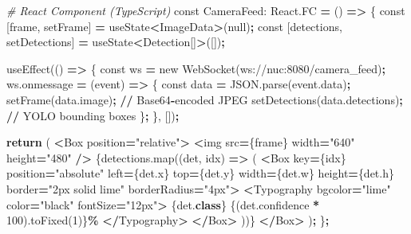 \documentclass[
]{article}
\newenvironment{Shaded}{\begin{snugshade}}{\end{snugshade}}
\newcommand{\BuiltInTok}[1]{#1}
\newcommand{\CommentTok}[1]{\textcolor[rgb]{0.56,0.35,0.01}{\textit{#1}}}
\newcommand{\ControlFlowTok}[1]{\textcolor[rgb]{0.13,0.29,0.53}{\textbf{#1}}}
\newcommand{\DecValTok}[1]{\textcolor[rgb]{0.00,0.00,0.81}{#1}}
\newcommand{\KeywordTok}[1]{\textcolor[rgb]{0.13,0.29,0.53}{\textbf{#1}}}
\newcommand{\NormalTok}[1]{#1}
\newcommand{\OperatorTok}[1]{\textcolor[rgb]{0.81,0.36,0.00}{\textbf{#1}}}
\newcommand{\StringTok}[1]{\textcolor[rgb]{0.31,0.60,0.02}{#1}}
\begin{document}
\begin{Shaded}
\begin{Highlighting}[]
\CommentTok{\# React Component (TypeScript)}
\NormalTok{const CameraFeed: React.FC }\OperatorTok{=}\NormalTok{ () }\OperatorTok{=\textgreater{}}\NormalTok{ \{}
\NormalTok{  const [frame, setFrame] }\OperatorTok{=}\NormalTok{ useState}\OperatorTok{\textless{}}\NormalTok{ImageData}\OperatorTok{\textgreater{}}\NormalTok{(null)}\OperatorTok{;}
\NormalTok{  const [detections, setDetections] }\OperatorTok{=}\NormalTok{ useState}\OperatorTok{\textless{}}\NormalTok{Detection[]}\OperatorTok{\textgreater{}}\NormalTok{([])}\OperatorTok{;}

\NormalTok{  useEffect(() }\OperatorTok{=\textgreater{}}\NormalTok{ \{}
\NormalTok{    const ws }\OperatorTok{=}\NormalTok{ new WebSocket(}\StringTok{\textquotesingle{}ws://nuc:8080/camera\_feed\textquotesingle{}}\NormalTok{)}\OperatorTok{;}
\NormalTok{    ws.onmessage }\OperatorTok{=}\NormalTok{ (event) }\OperatorTok{=\textgreater{}}\NormalTok{ \{}
\NormalTok{      const data }\OperatorTok{=}\NormalTok{ JSON.parse(event.data)}\OperatorTok{;}
\NormalTok{      setFrame(data.image)}\OperatorTok{;}  \OperatorTok{//}\NormalTok{ Base64}\OperatorTok{{-}}\NormalTok{encoded JPEG}
\NormalTok{      setDetections(data.detections)}\OperatorTok{;}  \OperatorTok{//}\NormalTok{ YOLO bounding boxes}
\NormalTok{    \}}\OperatorTok{;}
\NormalTok{  \}, [])}\OperatorTok{;}

  \ControlFlowTok{return}\NormalTok{ (}
    \OperatorTok{\textless{}}\NormalTok{Box position}\OperatorTok{=}\StringTok{"relative"}\OperatorTok{\textgreater{}}
      \OperatorTok{\textless{}}\NormalTok{img src}\OperatorTok{=}\NormalTok{\{frame\} width}\OperatorTok{=}\StringTok{"640"}\NormalTok{ height}\OperatorTok{=}\StringTok{"480"} \OperatorTok{/\textgreater{}}
\NormalTok{      \{detections.}\BuiltInTok{map}\NormalTok{((det, idx) }\OperatorTok{=\textgreater{}}\NormalTok{ (}
        \OperatorTok{\textless{}}\NormalTok{Box key}\OperatorTok{=}\NormalTok{\{idx\} position}\OperatorTok{=}\StringTok{"absolute"}
\NormalTok{             left}\OperatorTok{=}\NormalTok{\{det.x\} top}\OperatorTok{=}\NormalTok{\{det.y\} width}\OperatorTok{=}\NormalTok{\{det.w\} height}\OperatorTok{=}\NormalTok{\{det.h\}}
\NormalTok{             border}\OperatorTok{=}\StringTok{"2px solid lime"}\NormalTok{ borderRadius}\OperatorTok{=}\StringTok{"4px"}\OperatorTok{\textgreater{}}
          \OperatorTok{\textless{}}\NormalTok{Typography bgcolor}\OperatorTok{=}\StringTok{"lime"}\NormalTok{ color}\OperatorTok{=}\StringTok{"black"}\NormalTok{ fontSize}\OperatorTok{=}\StringTok{"12px"}\OperatorTok{\textgreater{}}
\NormalTok{            \{det.}\KeywordTok{class}\NormalTok{\} \{(det.confidence }\OperatorTok{*} \DecValTok{100}\NormalTok{).toFixed(}\DecValTok{1}\NormalTok{)\}}\OperatorTok{\%}
          \OperatorTok{\textless{}/}\NormalTok{Typography}\OperatorTok{\textgreater{}}
        \OperatorTok{\textless{}/}\NormalTok{Box}\OperatorTok{\textgreater{}}
\NormalTok{      ))\}}
    \OperatorTok{\textless{}/}\NormalTok{Box}\OperatorTok{\textgreater{}}
\NormalTok{  )}\OperatorTok{;}
\NormalTok{\}}\OperatorTok{;}
\end{Highlighting}
\end{Shaded}
\end{document}
